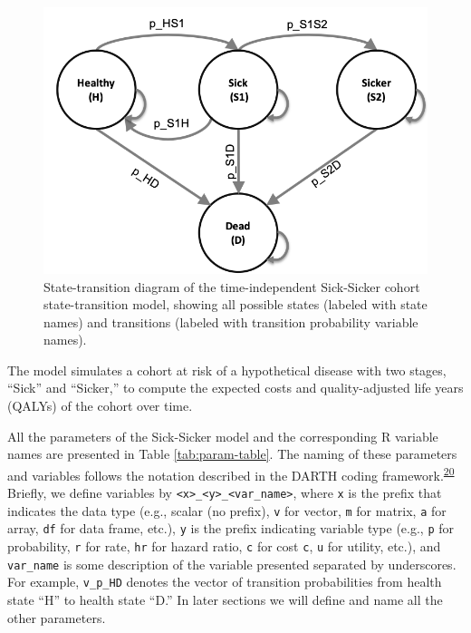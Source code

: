 \documentclass[
]{article}
\begin{document}
\begin{figure}[H]

{\centering \includegraphics[width=10.64in]{figs/Sick-Sicker} 

}

\caption{State-transition diagram of the time-independent Sick-Sicker cohort state-transition model, showing all possible states (labeled with state names) and transitions (labeled with transition probability variable names).}\label{fig:STD-Sick-Sicker}
\end{figure}

The model simulates a cohort at risk of a hypothetical disease with two stages, ``Sick'' and ``Sicker,'' to compute the expected costs and quality-adjusted life years (QALYs) of the cohort over time.

All the parameters of the Sick-Sicker model and the corresponding R variable names are presented in Table \ref{tab:param-table}. The naming of these parameters and variables follows the notation described in the DARTH coding framework.\textsuperscript{\protect\hyperlink{ref-Alarid-Escudero2019e}{20}} Briefly, we define variables by \texttt{\textless{}x\textgreater{}\_\textless{}y\textgreater{}\_\textless{}var\_name\textgreater{}}, where \texttt{x} is the prefix that indicates the data type (e.g., scalar (no prefix), \texttt{v} for vector, \texttt{m} for matrix, \texttt{a} for array, \texttt{df} for data frame, etc.), \texttt{y} is the prefix indicating variable type (e.g., \texttt{p} for probability, \texttt{r} for rate, \texttt{hr} for hazard ratio, \texttt{c} for cost \texttt{c}, \texttt{u} for utility, etc.), and \texttt{var\_name} is some description of the variable presented separated by underscores. For example, \texttt{v\_p\_HD} denotes the vector of transition probabilities from health state ``H'' to health state ``D.'' In later sections we will define and name all the other parameters.
\end{document}
